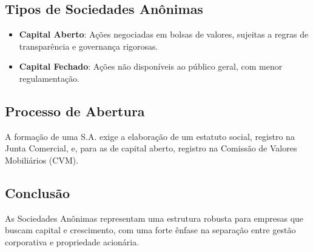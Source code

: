 \subsection{Tipos de Sociedades Anônimas}
\begin{itemize}
    \item \textbf{Capital Aberto}: Ações negociadas em bolsas de valores, sujeitas a regras de transparência e governança rigorosas.
    \item \textbf{Capital Fechado}: Ações não disponíveis ao público geral, com menor regulamentação.
\end{itemize}

\subsection{Processo de Abertura}
A formação de uma S.A. exige a elaboração de um estatuto social, registro na Junta Comercial, e, para as de capital aberto, registro na Comissão de Valores Mobiliários (CVM).

\subsection{Conclusão}
As Sociedades Anônimas representam uma estrutura robusta para empresas que buscam capital e crescimento, com uma forte ênfase na separação entre gestão corporativa e propriedade acionária.
